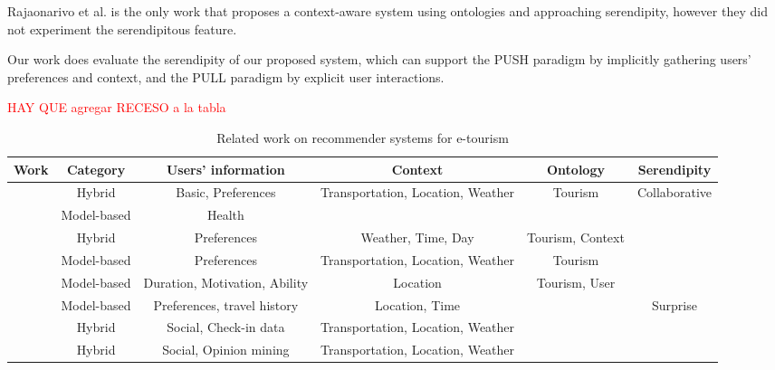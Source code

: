 Rajaonarivo et al. \cite{rajaonarivo2019rec} is the only work that proposes a context-aware system using ontologies and approaching serendipity, however they did not experiment the serendipitous feature.

Our work does evaluate the serendipity of our proposed system, which can support the PUSH paradigm by implicitly gathering users' preferences and context, and the PULL paradigm by explicit user interactions.

\textcolor{red}{HAY QUE agregar RECESO a la tabla}

\begin{table*}[h!]
    \centering
    \caption{Related work on recommender systems for e-tourism}
    \label{table:related-work}
    \begin{tabular}{|c|c|c|c|c|c|} 
        \hline
        \textbf{Work} & \textbf{Category} & \textbf{Users' information} & \textbf{Context}&\textbf{Ontology}&\textbf{Serendipity} \\
        \hline \hline 

        \cite{rajaonarivo2019rec} & Hybrid & Basic, Preferences & Transportation, Location, Weather & Tourism & Collaborative \\ \hline

        \cite{santos2019using} & Model-based & Health & & & \\ \hline

        \cite{bahramian_abbaspour_claramunt_2017} & Hybrid & Preferences & Weather, Time, Day & Tourism, Context & \\ \hline

        \cite{arigi2018context} & Model-based & Preferences & Transportation, Location, Weather & Tourism & \\ \hline

        \cite{ruotsalo2013smartmuseum} & Model-based & Duration, Motivation, Ability & Location & Tourism, User & \\ \hline

        \cite{shen2016attraction} & Model-based & Preferences, travel history & Location, Time & & Surprise \\ \hline

        \cite{kesorn2017personalized} & Hybrid & Social, Check-in data & Transportation, Location, Weather & & \\ \hline

        \cite{logesh2019exploring} & Hybrid & Social, Opinion mining & Transportation, Location, Weather &  & \\ \hline


\end{tabular}
\end{table*}

